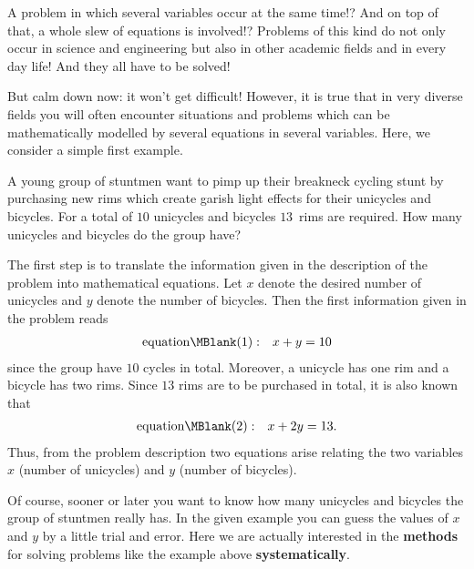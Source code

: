 \begin{MIntro}


A problem in which several variables occur at the same time!? And on top of that, 
a whole slew of equations is involved!? Problems of this kind do not only occur in science and 
engineering but also in other academic fields and in every day life! And they all have to be solved!

But calm down now: it won't get difficult! However, it is true that in very diverse fields  
you will often encounter situations and problems which can be mathematically modelled by
several equations in several variables. Here, we consider a simple first example.

\begin{MExample}
A young group of stuntmen want to pimp up their breakneck cycling stunt by purchasing new rims which create 
garish light effects for their unicycles and bicycles. For a total of $10$ unicycles and bicycles
$13$~rims are required. How many unicycles and bicycles do the group have? 

The first step is to translate the information given in the description of the problem into mathematical equations. Let $x$ denote the desired number of unicycles and $y$ denote the number of 
bicycles. Then the first information given in the problem reads
\begin{eqnarray*}
\mbox{equation}\MBlank (1) & : & x + y = 10
\end{eqnarray*}
since the group have $10$ cycles in total. Moreover, a unicycle has one rim and a bicycle has 
two rims. Since $13$ rims are to be purchased in total, it is also known that
\begin{eqnarray*}
\mbox{equation}\MBlank (2) & : & x + 2 y = 13.
\end{eqnarray*}
Thus, from the problem description two equations arise relating the two variables 
$x$ (number of unicycles) and $y$ (number of bicycles).
\end{MExample}

Of course, sooner or later you want to know how many unicycles and bicycles the group 
of stuntmen really has. In the given example you can guess the values of $x$ and $y$ by
a little trial and error. Here we are actually interested in the \textbf{methods}
for solving problems like the example above \textbf{systematically}.
\end{MIntro}

